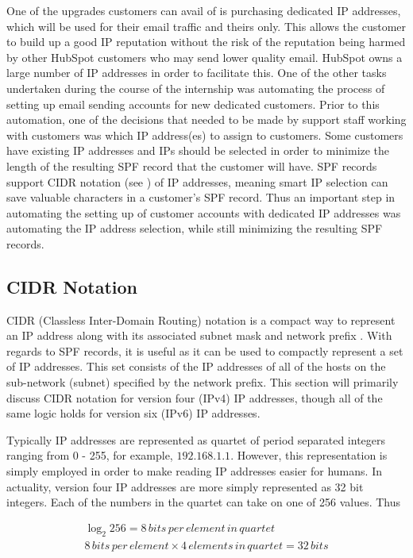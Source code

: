 One of the upgrades customers can avail of is purchasing dedicated IP addresses, which will be used for their email traffic and theirs only. This allows the customer to build up a good IP reputation without the risk of the reputation being harmed by other HubSpot customers who may send lower quality email. HubSpot owns a large number of IP addresses in order to facilitate this. One of the other tasks undertaken during the course of the internship was automating the process of setting up email sending accounts for new dedicated customers. Prior to this automation, one of the decisions that needed to be made by support staff working with customers was which IP address(es) to assign to customers. Some customers have existing IP addresses and IPs should be selected in order to minimize the length of the resulting SPF record that the customer will have. SPF records support CIDR notation (see ) of IP addresses, meaning smart IP selection can save valuable characters in a customer's SPF record. Thus an important step in automating the setting up of customer accounts with dedicated IP addresses was automating the IP address selection, while still minimizing the resulting SPF records.

\subsection{CIDR Notation} \label{sec:CIDR}
CIDR (Classless Inter-Domain Routing) notation is a compact way to represent an IP address along with its associated subnet mask and network prefix \cite{cidr}. With regards to SPF records, it is useful as it can be used to compactly represent a set of IP addresses. This set consists of the IP addresses of all of the hosts on the sub-network (subnet) specified by the network prefix. This section will primarily discuss CIDR notation for version four (IPv4) IP addresses, though all of the same logic holds for version six (IPv6) IP addresses. 

Typically IP addresses are represented as quartet of period separated integers ranging from 0 - 255, for example, $192.168.1.1$. However, this representation is simply employed in order to make reading IP addresses easier for humans. In actuality, version four IP addresses are more simply represented as 32 bit integers. Each of the numbers in the quartet can take on one of 256 values. Thus

\begin{equation}
\begin{split}
\log_2 256 = 8\,bits\,per\,element\,in\,quartet \\
8\,bits\,per\,element \times 4\,elements\,in\,quartet = 32\, bits
\end{split}
\end{equation}



